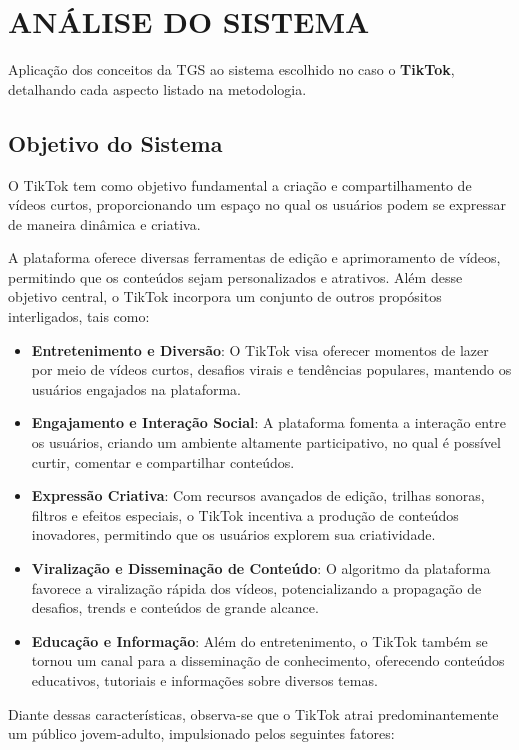 \section{ANÁLISE DO SISTEMA}

Aplicação dos conceitos da TGS ao sistema escolhido no caso o \textbf{TikTok}, detalhando cada aspecto listado na metodologia.

\subsection{Objetivo do Sistema}

O TikTok tem como objetivo fundamental a criação e compartilhamento de vídeos curtos, proporcionando um espaço no qual os usuários podem se expressar de maneira dinâmica e criativa.\vskip0.3cm 

A plataforma oferece diversas ferramentas de edição e aprimoramento de vídeos, permitindo que os conteúdos sejam personalizados e atrativos. Além desse objetivo central, o TikTok incorpora um conjunto de outros propósitos interligados, tais como:


\begin{itemize}
    \item \textbf{Entretenimento e Diversão}: O TikTok visa oferecer momentos de lazer por meio de vídeos curtos, desafios virais e tendências populares, mantendo os usuários engajados na plataforma.
    \item \textbf{Engajamento e Interação Social}: A plataforma fomenta a interação entre os usuários, criando um ambiente altamente participativo, no qual é possível curtir, comentar e compartilhar conteúdos.
    \item \textbf{Expressão Criativa}: Com recursos avançados de edição, trilhas sonoras, filtros e efeitos especiais, o TikTok incentiva a produção de conteúdos inovadores, permitindo que os usuários explorem sua criatividade.
    \item \textbf{Viralização e Disseminação de Conteúdo}: O algoritmo da plataforma favorece a viralização rápida dos vídeos, potencializando a propagação de desafios, trends e conteúdos de grande alcance.
    \item \textbf{Educação e Informação}: Além do entretenimento, o TikTok também se tornou um canal para a disseminação de conhecimento, oferecendo conteúdos educativos, tutoriais e informações sobre diversos temas.
\end{itemize}


Diante dessas características, observa-se que o TikTok atrai predominantemente um público jovem-adulto, impulsionado pelos seguintes fatores:


